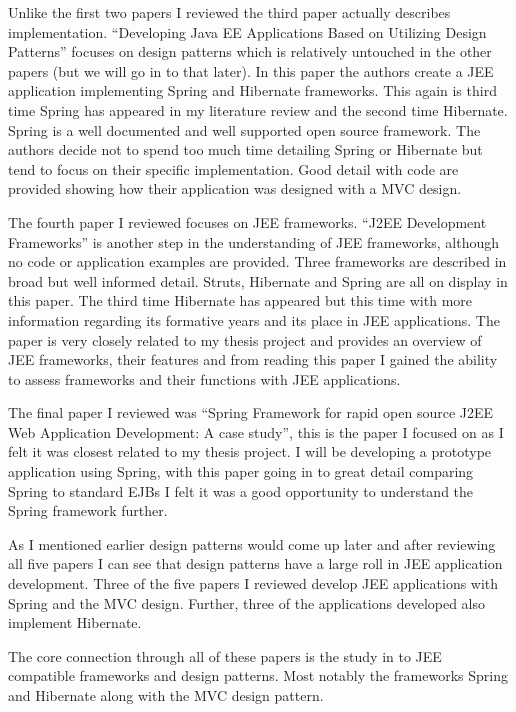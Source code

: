 														Unlike the first two papers I reviewed the third paper actually describes implementation. “Developing Java EE Applications Based on Utilizing Design Patterns” focuses on design patterns which is relatively untouched in the other papers (but we will go in to that later). In this paper the authors create a JEE application implementing Spring and Hibernate frameworks. This again is third time Spring has appeared in my literature review and the second time Hibernate. Spring is a well documented and well supported open source framework. The authors decide not to spend too much time detailing Spring or Hibernate but tend to focus on their specific implementation. Good detail with code are provided showing how their application was designed with a MVC design.
														
														The fourth paper I reviewed focuses on JEE frameworks. “J2EE Development Frameworks” is another step in the understanding of JEE frameworks, although no code or application examples are provided. Three frameworks are described in broad but well informed detail. Struts, Hibernate and Spring are all on display in this paper. The third time Hibernate has appeared but this time with more information regarding its formative years and its place in JEE applications. The paper is very closely related to my thesis project and provides an overview of JEE frameworks, their features and from reading this paper I gained the ability to assess frameworks and their functions with JEE applications. 
														
														The final paper I reviewed was “Spring Framework for rapid open source J2EE Web Application Development: A case study”, this is the paper I focused on as I felt it was closest related to my thesis project. I will be developing a prototype application using Spring, with this paper going in to great detail comparing Spring to standard EJBs I felt it was a good opportunity to understand the Spring framework further.
														
														As I mentioned earlier design patterns would come up later and after reviewing all five papers I can see that design patterns have a large roll in JEE application development. Three of the five papers I reviewed develop JEE applications with Spring and the MVC design. Further, three of the applications developed also implement Hibernate.
														
														The core connection through all of these papers is the study in to JEE compatible frameworks and design patterns. Most notably  the frameworks Spring and Hibernate along with the MVC design pattern.
														
